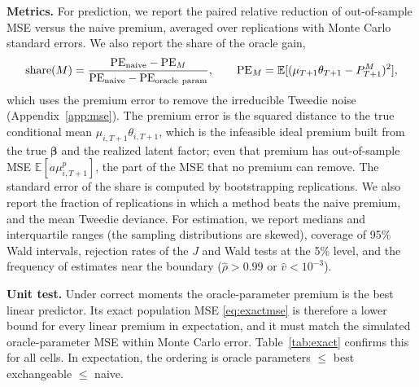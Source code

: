 \documentclass[mathematics,article,submit,moreauthors]{Definitions/mdpi}
\newcommand{\E}{\mathbb{E}}
\newcommand{\bbeta}{\boldsymbol{\beta}}
\begin{document}
\textbf{Metrics.} For prediction, we report the paired relative reduction of out-of-sample MSE versus the naive premium, averaged over replications with Monte Carlo standard errors. We also report the share of the oracle gain,
\[
\text{share}(M)=\frac{\mathrm{PE}_{\rm naive}-\mathrm{PE}_M}{\mathrm{PE}_{\rm naive}-\mathrm{PE}_{\rm oracle\ param}},\qquad \mathrm{PE}_M=\E[(\mu_{T+1}\theta_{T+1}-P^M_{T+1})^2],
\]
which uses the premium error to remove the irreducible Tweedie noise (Appendix~\ref{app:mse}). The premium error is the squared distance to the true conditional mean $\mu_{i,T+1}\theta_{i,T+1}$, which is the infeasible ideal premium built from the true $\bbeta$ and the realized latent factor; even that premium has out-of-sample MSE $\E[a\mu_{i,T+1}^p]$, the part of the MSE that no premium can remove. The standard error of the share is computed by bootstrapping replications. We also report the fraction of replications in which a method beats the naive premium, and the mean Tweedie deviance. For estimation, we report medians and interquartile ranges (the sampling distributions are skewed), coverage of 95\% Wald intervals, rejection rates of the $J$ and Wald tests at the 5\% level, and the frequency of estimates near the boundary ($\hat\rho>0.99$ or $\hat v<10^{-3}$).

\textbf{Unit test.} Under correct moments the oracle-parameter premium is the best linear predictor. Its exact population MSE \eqref{eq:exactmse} is therefore a lower bound for every linear premium in expectation, and it must match the simulated oracle-parameter MSE within Monte Carlo error. Table~\ref{tab:exact} confirms this for all cells. In expectation, the ordering is oracle parameters $\le$ best exchangeable $\le$ naive.
\end{document}
